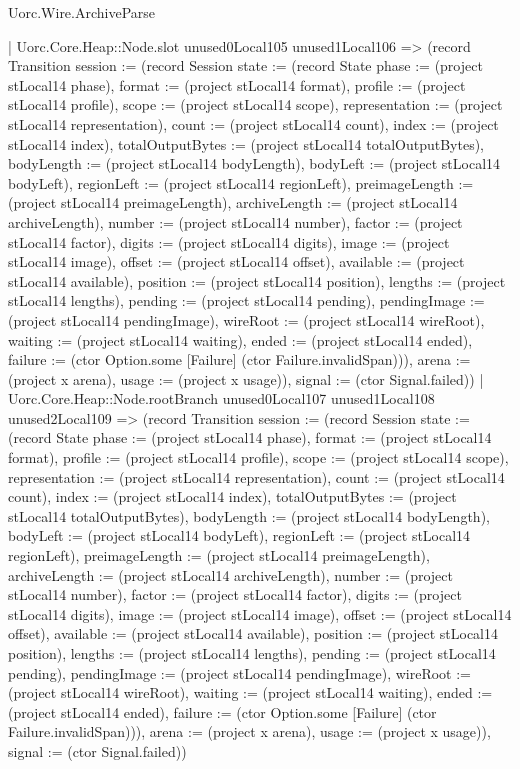 \begin{lexlean}{Uorc.Wire.ArchiveParse}
\begin{semanticmodule}
{            | Uorc.Core.Heap::Node.slot unused0Local105 unused1Local106 => (record Transition {session := (record Session {state := (record State {phase := (project stLocal14 phase), format := (project stLocal14 format), profile := (project stLocal14 profile), scope := (project stLocal14 scope), representation := (project stLocal14 representation), count := (project stLocal14 count), index := (project stLocal14 index), totalOutputBytes := (project stLocal14 totalOutputBytes), bodyLength := (project stLocal14 bodyLength), bodyLeft := (project stLocal14 bodyLeft), regionLeft := (project stLocal14 regionLeft), preimageLength := (project stLocal14 preimageLength), archiveLength := (project stLocal14 archiveLength), number := (project stLocal14 number), factor := (project stLocal14 factor), digits := (project stLocal14 digits), image := (project stLocal14 image), offset := (project stLocal14 offset), available := (project stLocal14 available), position := (project stLocal14 position), lengths := (project stLocal14 lengths), pending := (project stLocal14 pending), pendingImage := (project stLocal14 pendingImage), wireRoot := (project stLocal14 wireRoot), waiting := (project stLocal14 waiting), ended := (project stLocal14 ended), failure := (ctor Option.some [Failure] (ctor Failure.invalidSpan))}), arena := (project x arena), usage := (project x usage)}), signal := (ctor Signal.failed)})
            | Uorc.Core.Heap::Node.rootBranch unused0Local107 unused1Local108 unused2Local109 => (record Transition {session := (record Session {state := (record State {phase := (project stLocal14 phase), format := (project stLocal14 format), profile := (project stLocal14 profile), scope := (project stLocal14 scope), representation := (project stLocal14 representation), count := (project stLocal14 count), index := (project stLocal14 index), totalOutputBytes := (project stLocal14 totalOutputBytes), bodyLength := (project stLocal14 bodyLength), bodyLeft := (project stLocal14 bodyLeft), regionLeft := (project stLocal14 regionLeft), preimageLength := (project stLocal14 preimageLength), archiveLength := (project stLocal14 archiveLength), number := (project stLocal14 number), factor := (project stLocal14 factor), digits := (project stLocal14 digits), image := (project stLocal14 image), offset := (project stLocal14 offset), available := (project stLocal14 available), position := (project stLocal14 position), lengths := (project stLocal14 lengths), pending := (project stLocal14 pending), pendingImage := (project stLocal14 pendingImage), wireRoot := (project stLocal14 wireRoot), waiting := (project stLocal14 waiting), ended := (project stLocal14 ended), failure := (ctor Option.some [Failure] (ctor Failure.invalidSpan))}), arena := (project x arena), usage := (project x usage)}), signal := (ctor Signal.failed)})
}
\end{semanticmodule}
\end{lexlean}
